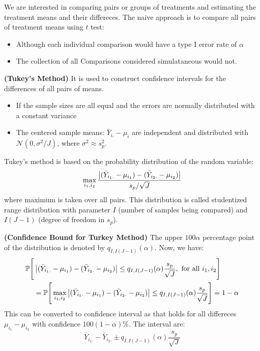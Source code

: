 \begin{remark}
    We are interested in comparing pairs or groups of treatments and estimating the treatment means and their differeces. The naive approach is to compare all pairs of treatment means using $t$ test:
    \begin{itemize}
        \item Although each individual comparison would have a type I error rate of $\alpha$
        \item The collection of all Comparisons considered simulataneous would not. 
    \end{itemize}
\end{remark}

\begin{definition}{\textbf{(Tukey's Method)}}
    It is used to construct confidence intervals for the differences of all pairs of means. 
    \begin{itemize}
        \item If the sample sizes are all equal and the errors are normally distributed with a constant variance
        \item The centered sample means: $\bar{Y}_{i.} - \mu_i$ are independent and distributed with $\mathcal{N}(0, \sigma^2/J)$, where $\sigma^2 \approx s^2_p$. 
    \end{itemize}
    Tukey's method is based on the probability distribution of the random variable:
    \begin{equation*}
        \max_{i_1,i_2}\frac{\left| (\bar{Y}_{i_1.} - \mu_{i_1}) - (\bar{Y}_{i_2.}-\mu_{i_2}) \right|}{s_p/\sqrt{J}}
    \end{equation*}
    where maximum is taken over all pairs. This distribution is called studentized range distribution with parameter $I$ (number of samples being compared) and $I(J-1)$ (degree of freedom in $s_p$).
\end{definition}

\begin{remark}{\textbf{(Confidence Bound for Turkey Method)}}
    The upper $100\alpha$ percentage point of the distribution is denoted by $q_{I, I(J-1)}(\alpha)$. Now, we have:
    \begin{equation*}
    \begin{aligned}
        \mathbb{P}\Bigg[ &\left| (\bar{Y}_{i_1.} - \mu_{i_1}) - (\bar{Y}_{i_2.}-\mu_{i_2}) \right| \le q_{I, I(J-1)}(\alpha)\frac{s_p}{\sqrt{J}} , \text{ for all } i_1, i_2 \Bigg] \\
        &=\mathbb{P}\Bigg[ \max_{i_1,i_2}\left| (\bar{Y}_{i_1.} - \mu_{i_1}) - (\bar{Y}_{i_2.}-\mu_{i_2}) \right| \le q_{I, I(J-1)}(\alpha)\frac{s_p}{\sqrt{J}} \Bigg] = 1-\alpha \\
    \end{aligned}
    \end{equation*}
    This can be converted to confidence interval as that holds for all differeces $\mu_{i_1} - \mu_{i_2}$ with confidence $100(1-\alpha)\%$. The interval are:
    \begin{equation*}
        \bar{Y}_{i_1.} - \bar{Y}_{i_2.} \pm q_{I, I(J-1)}(\alpha)\frac{s_p}{\sqrt{J}}
    \end{equation*}
\end{remark}

